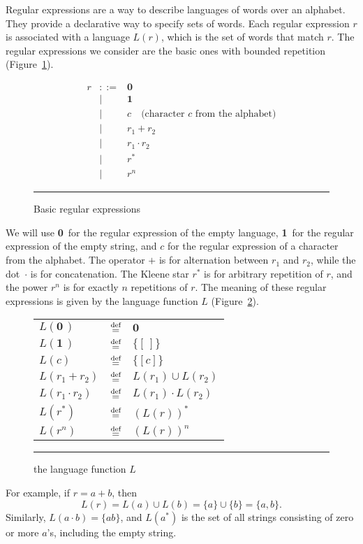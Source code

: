 \documentclass[12pt]{article}
\newcommand{\dn}{\ensuremath{\stackrel{\mbox{\scriptsize def}}{=}}}
\newcommand{\ZERO}{\textbf{0}}
\newcommand{\ONE}{\textbf{1}}
\newcommand{\emptylist}{[\,]}
\begin{document}
Regular expressions are a way to describe languages of words over an alphabet.
They provide a declarative way to specify sets of words. Each regular
expression $r$ is associated with a language $L(r)$, which is the set of words
that match $r$. The regular expressions we consider are the basic ones with bounded repetition (Figure~\ref{basicRegex}).
\begin{figure}[ht]
  \begin{center}
\[
\begin{array}{rcl}
r &::=& \ZERO  \\
  &\mid& \ONE \\
  &\mid& c \quad\text{(character $c$ from the alphabet)} \\
  &\mid& r_1 + r_2 \\
  &\mid& r_1 \cdot r_2  \\
  &\mid& r^* \\
  &\mid& r^n 
\end{array}
\]
  \rule{\linewidth}{0.4pt}
  \caption{Basic regular expressions}\label{basicRegex}
  \end{center}

\end{figure}
We will use \ZERO\ for the regular expression of the empty language, \ONE\ for
the regular expression of the empty string, and $c$ for the regular expression
of a character from the alphabet. The operator $+$ is for alternation between
$r_1$ and $r_2$, while the dot~$\cdot$ is for concatenation. The Kleene star
$r^\ast$ is for arbitrary repetition of $r$, and the power $r^n$ is for exactly
$n$ repetitions of $r$.
The meaning of these regular expressions is given by the language function $L$ (Figure~\ref{lFunction}).
\begin{figure}[ht]
\begin{center}
  \renewcommand{\arraystretch}{1.5}
  \begin{tabular}{lcl}
    $L(\ZERO\,)$            & \dn & $\ZERO$ \\
    $L(\ONE\,)$             & \dn & $\{\emptylist\}$ \\
    $L(c)$                  & \dn & $\{[c]\}$ \\
    $L(r_1 + r_2)$          & \dn & $L(r_1) \cup L(r_2)$ \\
    $L(r_1 \cdot r_2)$      & \dn & $L(r_1) \cdot L(r_2)$ \\
    $L(r^\ast)$             & \dn & $(L(r))^\ast$ \\
    $L(r^n)$                & \dn & $(L(r))^n$
  \end{tabular}
  \renewcommand{\arraystretch}{1.0}
  \mbox{}
     \rule{\linewidth}{0.4pt}
  \caption{the language function $L$}\label{lFunction}
  \end{center}
\end{figure}
For example, if $r = a + b$, then
\[
L(r) = L(a) \cup L(b) = \{a\} \cup \{b\} = \{a, b\}.
\]
\noindent Similarly, $L(a \cdot b) = \{ab\}$, and $L(a^*)$ is the set of all strings 
consisting of zero or more $a$'s, including the empty string.
\end{document}
